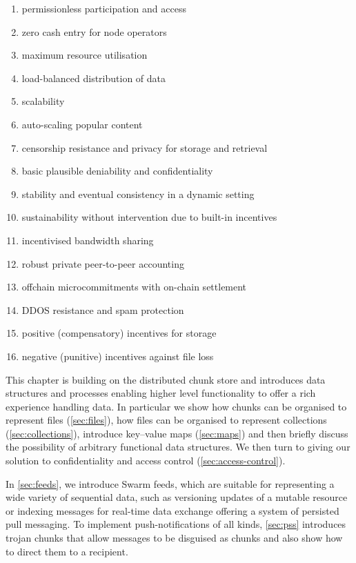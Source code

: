 \begin{enumerate}
    \item permissionless participation and access
    \item zero cash entry for node operators
    \item maximum resource utilisation 
    \item load-balanced distribution of data
    \item scalability 
    \item auto-scaling popular content
    \item censorship resistance and privacy for storage and retrieval
    \item basic plausible deniability and confidentiality 
    \item stability and eventual consistency in a dynamic setting
    \item sustainability without intervention due to built-in incentives
    \item incentivised bandwidth sharing
    \item robust private peer-to-peer accounting 
    \item offchain microcommitments with on-chain settlement
    \item DDOS resistance and spam protection
    \item positive (compensatory) incentives for storage
    \item negative (punitive) incentives against file loss
\end{enumerate}

This chapter is building on the distributed chunk store and introduces data structures and processes enabling higher level functionality to offer a rich experience handling data. In particular we show how chunks can be organised to represent files (\ref{sec:files}), how files can be organised to represent collections (\ref{sec:collections}), introduce key--value maps (\ref{sec:maps}) and then briefly discuss the possibility of arbitrary functional data structures. We then turn to giving our solution to confidentiality and access control (\ref{sec:access-control}). 

In \ref{sec:feeds}, we introduce Swarm feeds, which are suitable for representing a wide variety of sequential data, such as versioning updates of a mutable resource or indexing messages for real-time data exchange offering a system of persisted pull messaging. To implement push-notifications of all kinds, \ref{sec:pss} introduces trojan chunks that allow messages to be disguised as chunks and also show how to direct them to a recipient.                                                                                                                                                                                                                                                                                                                   

